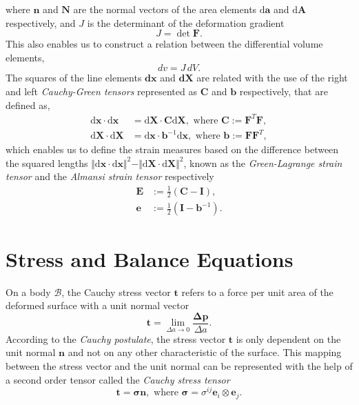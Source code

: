  where $\boldsymbol{n}$ and $\boldsymbol{N}$ are the normal vectors of the area elements $\mathrm{d}\boldsymbol{a}$ and $\mathrm{d}\boldsymbol{A}$ respectively, and $J$ is the determinant of the deformation gradient
 \begin{equation}\label{jacobian_deformation_gradient}
    J = \det\boldsymbol{F}.
 \end{equation}
 This also enables us to construct a relation between the differential volume elements,
 \begin{equation} \label{volume}
    dv = J\,dV.
 \end{equation}
The squares of the line elements $\mathbf{d}\boldsymbol{x}$ and $\mathbf{d}\boldsymbol{X}$ are related with the use of the right and left \emph{Cauchy-Green tensors} represented as $\boldsymbol{C}$ and
 $\boldsymbol{b}$ respectively, that are defined as,
\begin{align} \label{cauchy_green_tensors}
    \mathrm{d}\boldsymbol{x} \cdot \mathrm{d}\boldsymbol{x} &= \mathrm{d}\boldsymbol{X} \cdot \boldsymbol{C} \mathrm{d}\boldsymbol{X}, \text{ where } \boldsymbol{C} := \boldsymbol{F}^{T}\boldsymbol{F},\\
    \mathrm{d}\boldsymbol{X} \cdot \mathrm{d}\boldsymbol{X} &= \mathrm{d}\boldsymbol{x} \cdot \boldsymbol{b}^{-1} \mathrm{d}\boldsymbol{x}, \text{ where } \boldsymbol{b} := \boldsymbol{F} \boldsymbol{F}^{T},
\end{align}
which enables us to define the strain measures based on the difference between the squared lengths
 $\Vert\mathrm{d}\boldsymbol{x} \cdot \mathrm{d}\boldsymbol{x}\Vert^{2} - \Vert\mathrm{d}\boldsymbol{X} \cdot \mathrm{d}\boldsymbol{X}\Vert^{2} $, known as the \emph{Green-Lagrange strain tensor} and the \emph{Almansi strain tensor} respectively
\begin{align} \label{strain_measures}
    \boldsymbol{E} &:= \frac{1}{2} \left(\boldsymbol{C} - \boldsymbol{I}\right),\\
    \boldsymbol{e} &:= \frac{1}{2} \left(\boldsymbol{I} - \boldsymbol{b}^{-1}\right).
\end{align}
\section{Stress and Balance Equations}
On a body $\mathcal{B}$, the Cauchy stress vector $\mathbf{t}$ refers to a force per unit area of the deformed surface with a unit normal vector
\begin{equation} \label{traction_vector_definition}
    \mathbf{t} = \lim_{\Delta a \rightarrow 0} \frac{\mathbf{\Delta p}}{\Delta a}. 
\end{equation}
According to the \emph{Cauchy postulate}, the stress vector $\mathbf{t}$ is only dependent on the unit normal $\mathbf{n}$ and not on any other characteristic
 of the surface. This mapping between the stress vector and the unit normal can be represented with the help of a second order tensor called the \emph{Cauchy stress tensor}
 \begin{equation} \label{cauchy_stress_tensor}
    \mathbf{t} = \boldsymbol{\sigma} \mathbf{n}, \text{ where } \boldsymbol{\sigma} = \sigma^{ij} \mathbf{e}_{i} \otimes \mathbf{e}_{j}.
 \end{equation}

